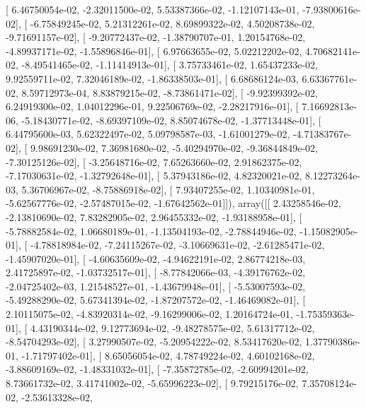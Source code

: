 \documentclass{article}
\begin{document}
       [  6.46750054e-02,  -2.32011500e-02,   5.53387366e-02,
         -1.12107143e-01,  -7.93800616e-02],
       [ -6.75849245e-02,   5.21312261e-02,   8.69899322e-02,
          4.50208738e-02,  -9.71691157e-02],
       [ -9.20772437e-02,  -1.38790707e-01,   1.20154768e-02,
         -4.89937171e-02,  -1.55896846e-01],
       [  6.97663655e-02,   5.02212202e-02,   4.70682141e-02,
         -8.49541465e-02,  -1.11414913e-01],
       [  3.75733461e-02,   1.65437233e-02,   9.92559711e-02,
          7.32046189e-02,  -1.86338503e-01],
       [  6.68686124e-03,   6.63367761e-02,   8.59712973e-04,
          8.83879215e-02,  -8.73861471e-02],
       [ -9.92399392e-02,   6.24919300e-02,   1.04012296e-01,
          9.22506769e-02,  -2.28217916e-01],
       [  7.16692813e-06,  -5.18430771e-02,  -8.69397109e-02,
          8.85074678e-02,  -1.37713448e-01],
       [  6.44795600e-03,   5.62322497e-02,   5.09798587e-03,
         -1.61001279e-02,  -4.71383767e-02],
       [  9.98691230e-02,   7.36981680e-02,  -5.40294970e-02,
         -9.36844849e-02,  -7.30125126e-02],
       [ -3.25648716e-02,   7.65263660e-02,   2.91862375e-02,
         -7.17030631e-02,  -1.32792648e-01],
       [  5.37943186e-02,   4.82320021e-02,   8.12273264e-03,
          5.36706967e-02,  -8.75886918e-02],
       [  7.93407255e-02,   1.10340981e-01,  -5.62567776e-02,
         -2.57487015e-02,  -1.67642562e-01]]), array([[  2.43258546e-02,  -2.13810690e-02,   7.83282905e-02,
          2.96455332e-02,  -1.93188958e-01],
       [ -5.78882584e-02,   1.06680189e-01,  -1.13504193e-02,
         -2.78844946e-02,  -1.15082905e-01],
       [ -4.78818984e-02,  -7.24115267e-02,  -3.10669631e-02,
         -2.61285471e-02,  -1.45907020e-01],
       [ -4.60635609e-02,  -4.94622191e-02,   2.86774218e-03,
          2.41725897e-02,  -1.03732517e-01],
       [ -8.77842066e-03,  -4.39176762e-02,  -2.04725402e-03,
          1.21548527e-01,  -1.43679948e-01],
       [ -5.53007593e-02,  -5.49288290e-02,   5.67341394e-02,
         -1.87207572e-02,  -1.46469082e-01],
       [  2.10115075e-02,  -4.83920314e-02,  -9.16299006e-02,
          1.20164724e-01,  -1.75359363e-01],
       [  4.43190344e-02,   9.12773694e-02,  -9.48278575e-02,
          5.61317712e-02,  -8.54704293e-02],
       [  3.27990507e-02,  -5.20954222e-02,   8.53417620e-02,
          1.37790386e-01,  -1.71797402e-01],
       [  8.65056054e-02,   4.78749224e-02,   4.60102168e-02,
         -3.88609169e-02,  -1.48331032e-01],
       [ -7.35872785e-02,  -2.60994201e-02,   8.73661732e-02,
          3.41741002e-02,  -5.65996223e-02],
       [  9.79215176e-02,   7.35708124e-02,  -2.53613328e-02,
\end{document}
